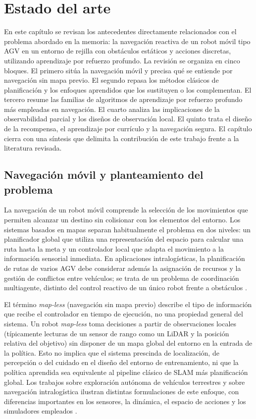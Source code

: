 \chapter{Estado del arte}\label{chap:estado-arte}

En este capítulo se revisan los antecedentes directamente relacionados con el
problema abordado en la memoria: la navegación reactiva de un robot móvil
tipo AGV en un entorno de rejilla con obstáculos estáticos y acciones
discretas, utilizando aprendizaje por refuerzo profundo. La revisión se
organiza en cinco bloques. El primero sitúa la navegación móvil y precisa
qué se entiende por navegación sin mapa previo. El segundo repasa los
métodos clásicos de planificación y los enfoques aprendidos que los
sustituyen o los complementan. El tercero resume las familias de algoritmos
de aprendizaje por refuerzo profundo más empleadas en navegación. El cuarto
analiza las implicaciones de la observabilidad parcial y los diseños de
observación local. El quinto trata el diseño de la recompensa, el
aprendizaje por currículo y la navegación segura. El capítulo cierra con
una síntesis que delimita la contribución de este trabajo frente a la
literatura revisada.

\section{Navegación móvil y planteamiento del problema}
La navegación de un robot móvil comprende la selección de los movimientos
que permiten alcanzar un destino sin colisionar con los elementos del
entorno. Los sistemas basados en mapas separan habitualmente el problema en
dos niveles: un planificador global que utiliza una representación del
espacio para calcular una ruta hasta la meta y un controlador local que
adapta el movimiento a la información sensorial inmediata. En aplicaciones
intralogísticas, la planificación de rutas de varios AGV debe considerar
además la asignación de recursos y la gestión de conflictos entre
vehículos; se trata de un problema de coordinación multiagente, distinto
del control reactivo de un único robot frente a obstáculos
\citep{hu2020deep,ye2023toward}.

El término \textit{map-less} (navegación sin mapa previo) describe
el tipo de información que recibe el controlador en tiempo de ejecución, no
una propiedad general del sistema. Un robot \textit{map-less} toma
decisiones a partir de observaciones locales (típicamente lecturas de un
sensor de rango como un LiDAR y la posición relativa del objetivo) sin
disponer de un mapa global del entorno en la entrada de la política. Esto
no implica que el sistema prescinda de localización, de percepción o del
cuidado en el diseño del entorno de entrenamiento, ni que la política
aprendida sea equivalente al pipeline clásico de SLAM más planificación
global. Los trabajos sobre exploración autónoma de vehículos terrestres y
sobre navegación intralogística ilustran distintas formulaciones de este
enfoque, con diferencias importantes en los sensores, la dinámica, el
espacio de acciones y los simuladores empleados
\citep{sivashangaran2023deep,xue2022using,guo2025map}.

